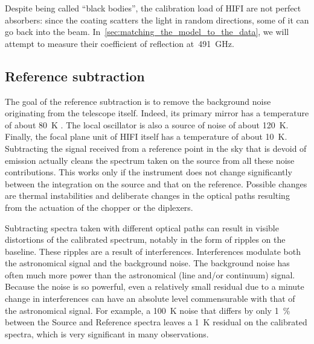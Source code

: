 Despite being called ``black bodies'', the calibration load of HIFI are not perfect absorbers:
since the coating scatters the light in random directions, some of it can go back into the beam.
In~\cref{sec:matching_the_model_to_the_data}, we will attempt to measure their coefficient of reflection at~\SI{491}{\giga\hertz}.

\subsection{Reference subtraction}
The goal of the reference subtraction is to remove the background noise originating from the telescope itself.
Indeed, its primary mirror has a temperature of about \SI{80}{\kelvin} \cite{Sein2004mirror}.
The local oscillator is also a source of noise of about \SI{120}{\kelvin}.
Finally, the focal plane unit of HIFI itself has a temperature of about \SI{10}{\kelvin}.
Subtracting the signal received from a reference point in the sky that is devoid of emission actually cleans the spectrum taken on the source from all these noise contributions.
This works only if the instrument does not change significantly between the integration on the source and that on the reference.
Possible changes are thermal instabilities and deliberate changes in the optical paths resulting from the actuation of the chopper or the diplexers.

Subtracting spectra taken with different optical paths can result in visible distortions of the calibrated spectrum, notably in the form of ripples on the baseline.
These ripples are a result of interferences.
Interferences modulate both the astronomical signal and the background noise.
The background noise has often much more power than the astronomical (line and/or continuum) signal.
Because the noise is so powerful, even a relatively small residual due to a minute change in interferences can have an absolute level commensurable with that of the astronomical signal.
For example, a \SI{100}{\kelvin} noise that differs by only \SI{1}{\percent} between the Source and Reference spectra leaves a \SI{1}{\kelvin} residual on the calibrated spectra, which is very significant in many observations.

